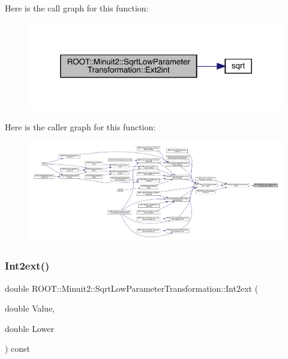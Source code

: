 Here is the call graph for this function\+:\nopagebreak
\begin{figure}[H]
\begin{center}
\leavevmode
\includegraphics[width=319pt]{df/db9/classROOT_1_1Minuit2_1_1SqrtLowParameterTransformation_a2035002e75f51cafc5e5d8afc05913e6_cgraph}
\end{center}
\end{figure}
Here is the caller graph for this function\+:\nopagebreak
\begin{figure}[H]
\begin{center}
\leavevmode
\includegraphics[width=350pt]{df/db9/classROOT_1_1Minuit2_1_1SqrtLowParameterTransformation_a2035002e75f51cafc5e5d8afc05913e6_icgraph}
\end{center}
\end{figure}
\mbox{\label{classROOT_1_1Minuit2_1_1SqrtLowParameterTransformation_aaa3325280a05beb0e3f07b542d0aa7d8}} 
\subsubsection{\texorpdfstring{Int2ext()}{Int2ext()}\hspace{0.1cm}{\footnotesize\ttfamily [1/2]}}
{\footnotesize\ttfamily double R\+O\+O\+T\+::\+Minuit2\+::\+Sqrt\+Low\+Parameter\+Transformation\+::\+Int2ext (\begin{DoxyParamCaption}\item[{double}]{Value,  }\item[{double}]{Lower }\end{DoxyParamCaption}) const}

